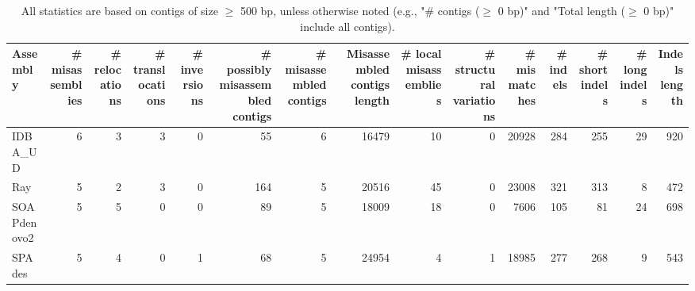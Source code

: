 \documentclass[12pt,a4paper]{article}
\begin{document}
\begin{table}[ht]
\begin{center}
\caption{All statistics are based on contigs of size $\geq$ 500 bp, unless otherwise noted (e.g., "\# contigs ($\geq$ 0 bp)" and "Total length ($\geq$ 0 bp)" include all contigs).}
\begin{tabular}{|l*{14}{|r}|}
\hline
Assembly & \# misassemblies &     \# relocations &     \# translocations &     \# inversions & \# possibly misassembled contigs & \# misassembled contigs & Misassembled contigs length & \# local misassemblies & \# structural variations & \# mismatches & \# indels &     \# short indels &     \# long indels & Indels length \\ \hline
IDBA\_UD & 6 & 3 & 3 & 0 & 55 & 6 & 16479 & 10 & 0 & 20928 & 284 & 255 & 29 & 920 \\ \hline
Ray & 5 & 2 & 3 & 0 & 164 & 5 & 20516 & 45 & 0 & 23008 & 321 & 313 & 8 & 472 \\ \hline
SOAPdenovo2 & 5 & 5 & 0 & 0 & 89 & 5 & 18009 & 18 & 0 & 7606 & 105 & 81 & 24 & 698 \\ \hline
SPAdes & 5 & 4 & 0 & 1 & 68 & 5 & 24954 & 4 & 1 & 18985 & 277 & 268 & 9 & 543 \\ \hline
\end{tabular}
\end{center}
\end{table}
\end{document}
